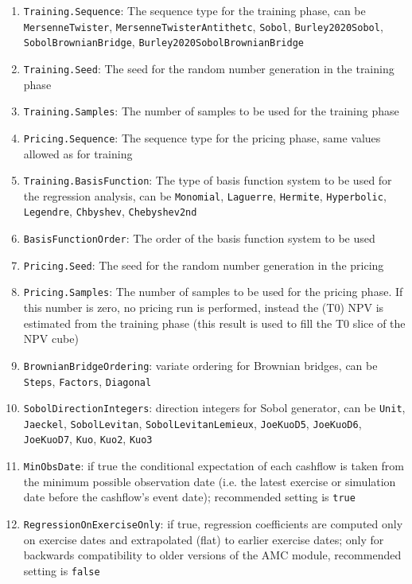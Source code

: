 \begin{enumerate}
\item \verb+Training.Sequence+: The sequence type for the training phase, can be \verb+MersenneTwister+,
  \verb+MersenneTwisterAntithetc+, \verb+Sobol+, \verb+Burley2020Sobol+, \verb+SobolBrownianBridge+,
  \verb+Burley2020SobolBrownianBridge+
\item \verb+Training.Seed+: The seed for the random number generation in the training phase
\item \verb+Training.Samples+: The number of samples to be used for the training phase
\item \verb+Pricing.Sequence+: The sequence type for the pricing phase, same values allowed as for training
\item \verb+Training.BasisFunction+: The type of basis function system to be used for the regression analysis, can be
  \verb+Monomial+, \verb+Laguerre+, \verb+Hermite+, \verb+Hyperbolic+, \verb+Legendre+, \verb+Chbyshev+,
  \verb+Chebyshev2nd+
\item \verb+BasisFunctionOrder+: The order of the basis function system to be used
\item \verb+Pricing.Seed+: The seed for the random number generation in the pricing
\item \verb+Pricing.Samples+: The number of samples to be used for the pricing phase. If this number is zero, no pricing
  run is performed, instead the (T0) NPV is estimated from the training phase (this result is used to fill the T0 slice
  of the NPV cube)
\item \verb+BrownianBridgeOrdering+: variate ordering for Brownian bridges, can be \verb+Steps+, \verb+Factors+,
  \verb+Diagonal+
\item \verb+SobolDirectionIntegers+: direction integers for Sobol generator, can be \verb+Unit+, \verb+Jaeckel+,
  \verb+SobolLevitan+, \verb+SobolLevitanLemieux+, \verb+JoeKuoD5+, \verb+JoeKuoD6+, \verb+JoeKuoD7+,
  \verb+Kuo+, \verb+Kuo2+, \verb+Kuo3+
\item \verb+MinObsDate+: if true the conditional expectation of each cashflow is taken from the minimum possible
  observation date (i.e. the latest exercise or simulation date before the cashflow's event date); recommended setting
  is \verb+true+
\item \verb+RegressionOnExerciseOnly+: if true, regression coefficients are computed only on exercise dates and
  extrapolated (flat) to earlier exercise dates; only for backwards compatibility to older versions of the AMC module,
  recommended setting is \verb+false+
\end{enumerate}


